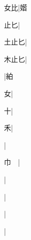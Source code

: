 \begin{multicols}{2}
{{\cjk{}{\cnsym{}　}女比}\mktsJzrVerticalBar{}{\cjk{}{\cnsym{}　}{\cnsym{}　}{\cnsym{}　}}|{\cjk{}媘}\par
{\cjk{}{\cnsym{}　}止匕}\mktsJzrVerticalBar{}{\cjk{}{\cnsym{}　}{\cnsym{}　}{\cnsym{}　}}|{}\par
{\cjk{}土止匕}\mktsJzrVerticalBar{}{\cjk{}{\cnsym{}　}{\cnsym{}　}{\cnsym{}　}}|{}\par
{\cjk{}木止匕}\mktsJzrVerticalBar{}{\cjk{}{\cnsym{}　}{\cnsym{}　}{\cnsym{}　}}|{}\par
{}\mktsJzrVerticalBar{}{\cjk{}{\cnsym{}　}{\cnsym{}　}{\cnsym{}　}}|{\cjk{}絈}\par
{\cjk{}{\cnsym{}　}{\cnsym{}　}女}\mktsJzrVerticalBar{}{\cjk{}{\cnsym{}　}{\cnsym{}　}{\cnsym{}　}}|{}\par
{\cjk{}{\cnsym{}　}{\cnsym{}　}十}|{}\par
{\cjk{}{\cnsym{}　}{\cnsym{}　}禾}|{}\par
{\cjk{}{\cnsym{}　}{\cnsym{}　}{\cnsym{}　}}|{}\par
{巾{\cnsym{}　}}|{}\par
{\cjk{}{\cnsym{}　}{\cnsym{}　}{\cnsym{}　}}|{}\par
{\cjk{}{\cnsym{}　}{\cnsym{}　}{\cnsym{}　}}|{}\par
{\cjk{}{\cnsym{}　}{\cnsym{}　}{\cnsym{}　}}|{}\par
{\cjk{}{\cnsym{}　}{\cnsym{}　}{\cnsym{}　}}|{}\par
}
\end{multicols}
